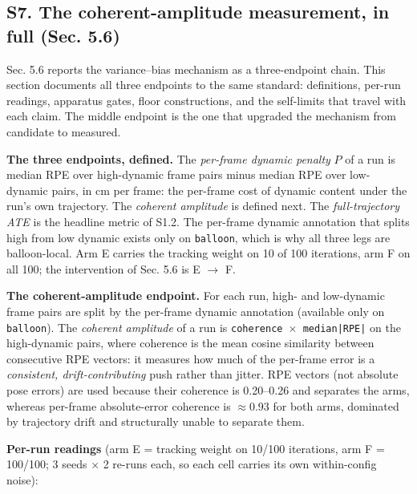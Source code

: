\subsection{S7. The coherent-amplitude measurement, in full (Sec. 5.6)}


Sec. 5.6 reports the variance--bias mechanism as a three-endpoint chain. This section documents all three endpoints to the same standard: definitions, per-run readings, apparatus gates, floor constructions, and the self-limits that travel with each claim. The middle endpoint is the one that upgraded the mechanism from candidate to measured.

\textbf{The three endpoints, defined.} The \emph{per-frame dynamic penalty} $P$ of a run is median RPE over high-dynamic frame pairs minus median RPE over low-dynamic pairs, in cm per frame: the per-frame cost of dynamic content under the run's own trajectory. The \emph{coherent amplitude} is defined next. The \emph{full-trajectory ATE} is the headline metric of S1.2. The per-frame dynamic annotation that splits high from low dynamic exists only on \texttt{balloon}, which is why all three legs are balloon-local. Arm E carries the tracking weight on 10 of 100 iterations, arm F on all 100; the intervention of Sec. 5.6 is E $\rightarrow$ F.


\textbf{The coherent-amplitude endpoint.} For each run, high- and low-dynamic frame pairs are split by the per-frame dynamic annotation (available only on \texttt{balloon}). The \emph{coherent amplitude} of a run is \texttt{coherence $\times$ median|RPE|} on the high-dynamic pairs, where coherence is the mean cosine similarity between consecutive RPE vectors: it measures how much of the per-frame error is a \emph{consistent, drift-contributing} push rather than jitter. RPE vectors (not absolute pose errors) are used because their coherence is 0.20--0.26 and separates the arms, whereas per-frame absolute-error coherence is $\approx$0.93 for both arms, dominated by trajectory drift and structurally unable to separate them.


\textbf{Per-run readings} (arm E = tracking weight on 10/100 iterations, arm F = 100/100; 3 seeds $\times$ 2 re-runs each, so each cell carries its own within-config noise):


